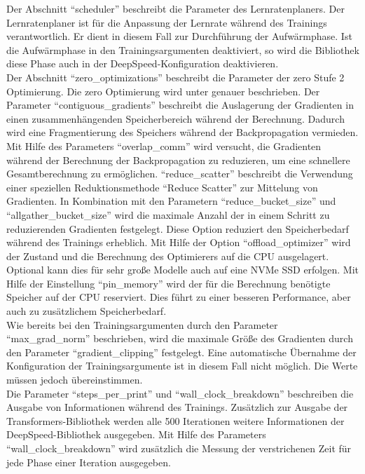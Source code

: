 Der Abschnitt \enquote{scheduler} beschreibt die Parameter des Lernratenplaners. Der Lernratenplaner ist für die Anpassung der Lernrate während des Trainings verantwortlich.
Er dient in diesem Fall zur Durchführung der Aufwärmphase. Ist die Aufwärmphase in den Trainingsargumenten deaktiviert, so wird die Bibliothek diese Phase auch in der DeepSpeed-Konfiguration deaktivieren.\\

Der Abschnitt \enquote{zero\_optimizations} beschreibt die Parameter der \ac{zero} Stufe 2 Optimierung.
Die \ac{zero} Optimierung wird unter \citet{deepspeed} genauer beschrieben.
Der Parameter \enquote{contiguous\_gradients} beschreibt die Auslagerung der Gradienten in einen zusammenhängenden Speicherbereich während der Berechnung.
Dadurch wird eine Fragmentierung des Speichers während der Backpropagation vermieden.
Mit Hilfe des Parameters \enquote{overlap\_comm} wird versucht, die Gradienten während der Berechnung der Backpropagation zu reduzieren, um eine schnellere Gesamtberechnung zu ermöglichen.
\enquote{reduce\_scatter} beschreibt die Verwendung einer speziellen Reduktionsmethode \enquote{Reduce Scatter} zur Mittelung von Gradienten.
In Kombination mit den Parametern \enquote{reduce\_bucket\_size} und \enquote{allgather\_bucket\_size} wird die maximale Anzahl der in einem Schritt zu reduzierenden Gradienten festgelegt.
Diese Option reduziert den Speicherbedarf während des Trainings erheblich.
Mit Hilfe der Option \enquote{offload\_optimizer} wird der Zustand und die Berechnung des Optimierers auf die CPU ausgelagert.
Optional kann dies für sehr große Modelle auch auf eine NVMe SSD erfolgen.
Mit Hilfe der Einstellung \enquote{pin\_memory} wird der für die Berechnung benötigte Speicher auf der CPU reserviert.
Dies führt zu einer besseren Performance, aber auch zu zusätzlichem Speicherbedarf.\\

Wie bereits bei den Trainingsargumenten durch den Parameter \enquote{max\_grad\_norm} beschrieben, wird die maximale Größe des Gradienten durch den Parameter \enquote{gradient\_clipping} festgelegt.
Eine automatische Übernahme der Konfiguration der Trainingsargumente ist in diesem Fall nicht möglich.
Die Werte müssen jedoch übereinstimmen.\\

Die Parameter \enquote{steps\_per\_print} und \enquote{wall\_clock\_breakdown} beschreiben die Ausgabe von Informationen während des Trainings.
Zusätzlich zur Ausgabe der Transformers-Bibliothek werden alle 500 Iterationen weitere Informationen der DeepSpeed-Bibliothek ausgegeben.
Mit Hilfe des Parameters \enquote{wall\_clock\_breakdown} wird zusätzlich die Messung der verstrichenen Zeit für jede Phase einer Iteration ausgegeben.\\


